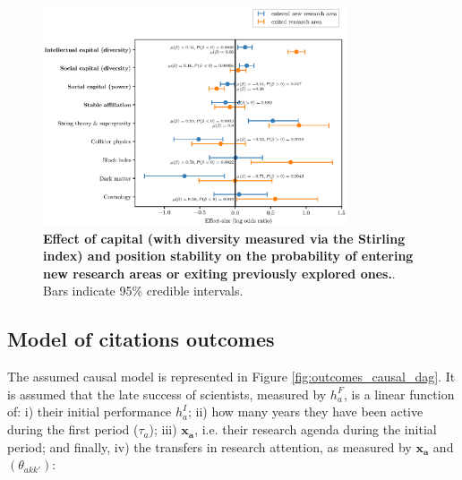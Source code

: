 \documentclass{article}
\begin{document}
\begin{figure}[H]
    \centering
    \includegraphics[width=0.8\textwidth]{plots/exited_score_effects_stirling_magnitude.eps}
    \caption{\textbf{Effect of capital (with diversity measured via the Stirling index) and position stability on the probability of entering new research areas or exiting previously explored ones.}. Bars indicate 95\% credible intervals.}
    \label{fig:diversification_score_stirling}
\end{figure}



\subsection{\label{appendix:outcomes}Model of citations outcomes}

The assumed causal model is represented in Figure \ref{fig:outcomes_causal_dag}. It is assumed that the late success of scientists, measured by $h_a^{F}$, is a linear function of: i) their initial performance $h_a^{I}$; ii) how many years they have been active during the first period ($\tau_a$); iii) $\bm{x_a}$, i.e. their research agenda during the initial period; and finally, iv) the transfers in research attention, as measured by $\bm{x_a}$ and $(\theta_{akk'})$:
\end{document}
